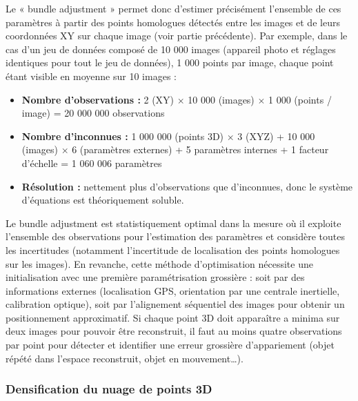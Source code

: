 Le « bundle adjustment » permet donc d’estimer précisément l’ensemble de ces paramètres à partir des points homologues détectés entre les images et de leurs coordonnées XY sur chaque image (voir partie précédente). Par exemple, dans le cas d’un jeu de données composé de 10 000 images (appareil photo et réglages identiques pour tout le jeu de données), 1 000 points par image, chaque point étant visible en moyenne sur 10 images :

\begin{itemize}
    \item \textbf{Nombre d’observations :} 2 (XY) $\times$ 10 000 (images) $\times$ 1 000 (points / image) = 20 000 000 observations
    
    \item \textbf{Nombre d’inconnues :} 1 000 000 (points 3D) $\times$ 3 (XYZ) + 10 000 (images) $\times$ 6 (paramètres externes) + 5 paramètres internes + 1 facteur d’échelle = 1 060 006 paramètres
    
    \item \textbf{Résolution :} nettement plus d’observations que d’inconnues, donc le système d’équations est théoriquement soluble.
\end{itemize}

Le bundle adjustment est statistiquement optimal dans la mesure où il exploite l’ensemble des observations pour l’estimation des paramètres et considère toutes les incertitudes (notamment l’incertitude de localisation des points homologues sur les images). En revanche, cette méthode d’optimisation nécessite une initialisation avec une première paramétrisation grossière : soit par des informations externes (localisation GPS, orientation par une centrale inertielle, calibration optique), soit par l’alignement séquentiel des images pour obtenir un positionnement approximatif. Si chaque point 3D doit apparaître a minima sur deux images pour pouvoir être reconstruit, il faut au moins quatre observations par point pour détecter et identifier une erreur grossière d’appariement (objet répété dans l’espace reconstruit, objet en mouvement…).

\subsubsection{Densification du nuage de points 3D}

